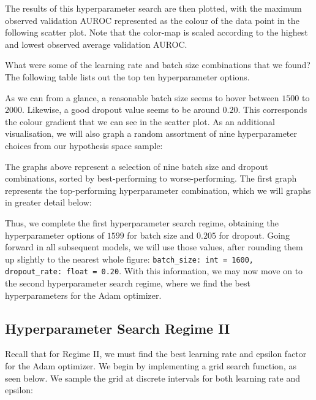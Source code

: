 

\noindent
The results of this hyperparameter search are then plotted, with the maximum observed validation AUROC represented as the colour of the data point in the following scatter plot. Note that the color-map is scaled according to the highest and lowest observed average validation AUROC.



\noindent
What were some of the learning rate and batch size combinations that we found? The following table lists out the top ten hyperparameter options.



\noindent
As we can from a glance, a reasonable batch size seems to hover between \(1500\) to \(2000\). Likewise, a good dropout value seems to be around \(0.20\). This corresponds the colour gradient that we can see in the scatter plot. As an additional visualisation, we will also graph a random assortment of nine hyperparameter choices from our hypothesis space sample:



\noindent
The graphs above represent a selection of nine batch size and dropout combinations, sorted by best-performing to worse-performing. The first graph represents the top-performing hyperparameter combination, which we will graphs in greater detail below:



\noindent
Thus, we complete the first hyperparameter search regime, obtaining the hyperparameter options of \(1599\) for batch size and \(0.205\) for dropout. Going forward in all subsequent models, we will use those values, after rounding them up slightly to the nearest whole figure: \texttt{batch_size: int = 1600, dropout_rate: float = 0.20}. With this information, we may now move on to the second hyperparameter search regime, where we find the best hyperparameters for the Adam optimizer.

\subsection{Hyperparameter Search Regime II}

Recall that for Regime II, we must find the best learning rate and epsilon factor for the Adam optimizer. We begin by implementing a grid search function, as seen below. We sample the grid at discrete intervals for both learning rate and epsilon:

